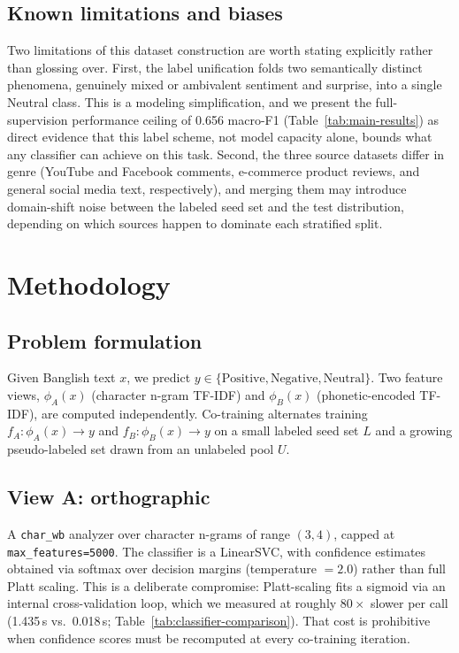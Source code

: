 \documentclass[conference]{IEEEtran}
\begin{document}
\subsection{Known limitations and biases}

Two limitations of this dataset construction are worth stating explicitly
rather than glossing over. First, the label unification folds two semantically
distinct phenomena, genuinely mixed or ambivalent sentiment and surprise, into
a single Neutral class. This is a modeling simplification, and
we present the full-supervision performance ceiling of 0.656 macro-F1
(Table~\ref{tab:main-results}) as direct evidence that this label scheme, not
model capacity alone, bounds what any classifier can achieve on this task.
Second, the three source datasets differ in genre (YouTube and Facebook
comments, e-commerce product reviews, and general social media text,
respectively), and merging them may introduce domain-shift noise between the
labeled seed set and the test distribution, depending on which sources happen
to dominate each stratified split.

\section{Methodology}
\label{sec:methodology}

\subsection{Problem formulation}

Given Banglish text $x$, we predict $y \in \{\text{Positive}, \text{Negative},
\text{Neutral}\}$. Two feature views, $\phi_A(x)$ (character n-gram TF-IDF)
and $\phi_B(x)$ (phonetic-encoded TF-IDF), are computed independently.
Co-training alternates training $f_A: \phi_A(x) \to y$ and $f_B: \phi_B(x)
\to y$ on a small labeled seed set $L$ and a growing pseudo-labeled set drawn
from an unlabeled pool $U$.

\subsection{View A: orthographic}

A \texttt{char\_wb} analyzer over character n-grams of range $(3,4)$, capped
at \texttt{max\_features=5000}. The classifier is a LinearSVC, with
confidence estimates obtained via softmax over decision margins
(temperature $=2.0$) rather than full Platt scaling. This is a deliberate
compromise: Platt-scaling \citep{platt1999probabilistic} fits a sigmoid via an
internal cross-validation loop, which we measured at roughly $80\times$
slower per call (1.435\,s vs.\ 0.018\,s; Table~\ref{tab:classifier-comparison}).
That cost is prohibitive when confidence scores must be recomputed at every
co-training iteration.
\end{document}
